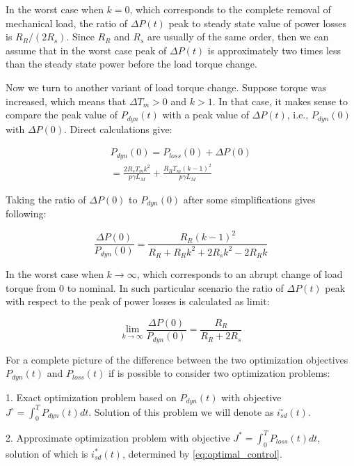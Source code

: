 \documentclass[journal]{IEEEtran}
\begin{document}
In the worst case when $k = 0$, which corresponds to the complete removal of mechanical load, the ratio of $\Delta P(t)$ peak to steady state value of power losses is $R_R/(2 R_s)$. Since $R_R$ and $R_s$ are usually of the same order, then we can assume that in the worst case peak of $\Delta P(t)$ is approximately two times less than the steady state power before the load torque change.

Now we turn to another variant of load torque change. Suppose torque was increased, which means that $\Delta T_m > 0$ and $k > 1$. In that case, it makes sense to compare the peak value of $P_{dyn}(t)$ with a peak value of $\Delta P(t)$, i.e., $P_{dyn}(0)$ with $ \Delta P(0)$. Direct calculations give:

\begin{equation}
\begin{gathered}
P_{dyn}(0) = P_{loss}(0) + \Delta P(0) \\
 = \frac{2 R_s T_m k^2}{p \gamma L_M} + \frac{R_R T_m (k - 1)^2}{p \gamma L_M}
\end{gathered}
\end{equation}

Taking the ratio of $\Delta P(0)$ to $P_{dyn}(0)$ after some simplifications gives following:

\begin{equation}
\frac{\Delta P(0)}{P_{dyn}(0)} = \frac{R_R (k - 1)^2}{R_R + R_R k^2 + 2 R_s k^2 - 2 R_R k}
\end{equation}

In the worst case when $k \to \infty$, which corresponds to an abrupt change of load torque from 0 to nominal. In such particular scenario the ratio of $\Delta P(t)$ peak with respect to the peak of power losses is calculated as limit:

\begin{equation}
\lim_{k \to \infty} \frac{\Delta P(0)}{P_{dyn}(0)} = \frac{R_R}{R_R + 2 R_s}
\end{equation}

For a complete picture of the difference between the two optimization objectives $P_{dyn}(t)$ and $P_{loss}(t)$ if is possible to consider two optimization problems:

1. Exact optimization problem based on $P_{dyn}(t)$ with objective $J^\circ = \int_0^T P_{dyn}(t) dt$. Solution of this problem we will denote as $i_{sd}^\circ(t)$.

2. Approximate optimization problem with objective $J^* = \int_0^T  P_{loss}(t) dt$, solution of which is $i_{sd}^*(t)$, determined by \eqref{eq:optimal_control}.
\end{document}
